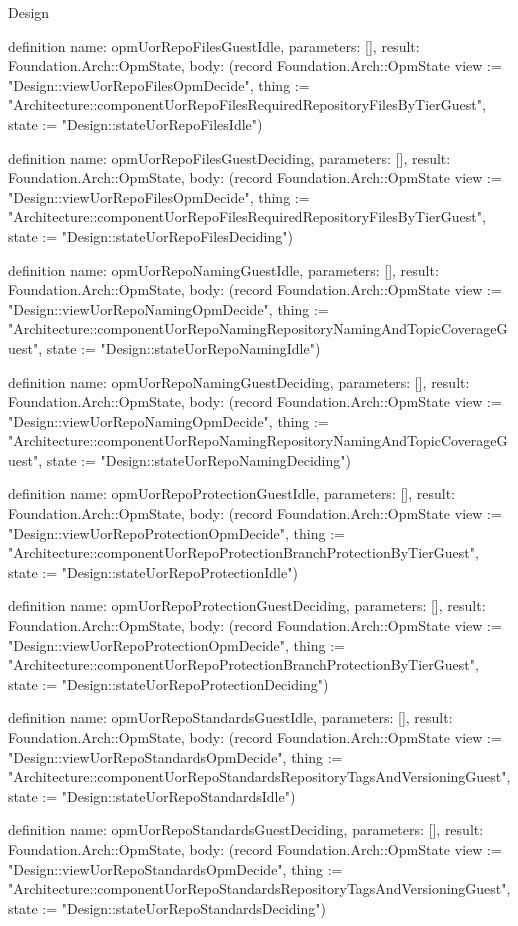 \begin{lexlean}{Design}
\begin{semanticmodule}
definition{
  name: opmUorRepoFilesGuestIdle,
  parameters: [],
  result: Foundation.Arch::OpmState,
  body: (record Foundation.Arch::OpmState {view := "Design::viewUorRepoFilesOpmDecide", thing := "Architecture::componentUorRepoFilesRequiredRepositoryFilesByTierGuest", state := "Design::stateUorRepoFilesIdle"})
}

definition{
  name: opmUorRepoFilesGuestDeciding,
  parameters: [],
  result: Foundation.Arch::OpmState,
  body: (record Foundation.Arch::OpmState {view := "Design::viewUorRepoFilesOpmDecide", thing := "Architecture::componentUorRepoFilesRequiredRepositoryFilesByTierGuest", state := "Design::stateUorRepoFilesDeciding"})
}

definition{
  name: opmUorRepoNamingGuestIdle,
  parameters: [],
  result: Foundation.Arch::OpmState,
  body: (record Foundation.Arch::OpmState {view := "Design::viewUorRepoNamingOpmDecide", thing := "Architecture::componentUorRepoNamingRepositoryNamingAndTopicCoverageGuest", state := "Design::stateUorRepoNamingIdle"})
}

definition{
  name: opmUorRepoNamingGuestDeciding,
  parameters: [],
  result: Foundation.Arch::OpmState,
  body: (record Foundation.Arch::OpmState {view := "Design::viewUorRepoNamingOpmDecide", thing := "Architecture::componentUorRepoNamingRepositoryNamingAndTopicCoverageGuest", state := "Design::stateUorRepoNamingDeciding"})
}

definition{
  name: opmUorRepoProtectionGuestIdle,
  parameters: [],
  result: Foundation.Arch::OpmState,
  body: (record Foundation.Arch::OpmState {view := "Design::viewUorRepoProtectionOpmDecide", thing := "Architecture::componentUorRepoProtectionBranchProtectionByTierGuest", state := "Design::stateUorRepoProtectionIdle"})
}

definition{
  name: opmUorRepoProtectionGuestDeciding,
  parameters: [],
  result: Foundation.Arch::OpmState,
  body: (record Foundation.Arch::OpmState {view := "Design::viewUorRepoProtectionOpmDecide", thing := "Architecture::componentUorRepoProtectionBranchProtectionByTierGuest", state := "Design::stateUorRepoProtectionDeciding"})
}

definition{
  name: opmUorRepoStandardsGuestIdle,
  parameters: [],
  result: Foundation.Arch::OpmState,
  body: (record Foundation.Arch::OpmState {view := "Design::viewUorRepoStandardsOpmDecide", thing := "Architecture::componentUorRepoStandardsRepositoryTagsAndVersioningGuest", state := "Design::stateUorRepoStandardsIdle"})
}

definition{
  name: opmUorRepoStandardsGuestDeciding,
  parameters: [],
  result: Foundation.Arch::OpmState,
  body: (record Foundation.Arch::OpmState {view := "Design::viewUorRepoStandardsOpmDecide", thing := "Architecture::componentUorRepoStandardsRepositoryTagsAndVersioningGuest", state := "Design::stateUorRepoStandardsDeciding"})
}


\end{semanticmodule}
\end{lexlean}
